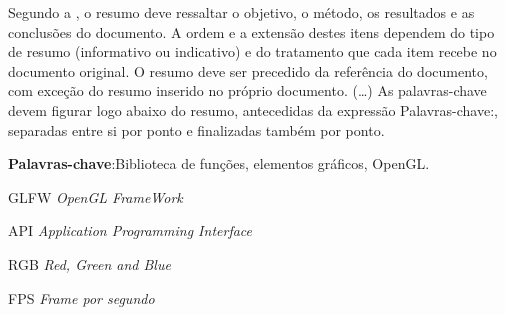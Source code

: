 \documentclass[12pt, %
openright,
oneside, %
a4paper,    %
brazil]{facom-ufu-abntex2}
\begin{document}





\begin{resumo} %
 Segundo a , o resumo deve ressaltar o
 objetivo, o método, os resultados e as conclusões do documento. A ordem e a extensão
 destes itens dependem do tipo de resumo (informativo ou indicativo) e do
 tratamento que cada item recebe no documento original. O resumo deve ser
 precedido da referência do documento, com exceção do resumo inserido no
 próprio documento. (\ldots) As palavras-chave devem figurar logo abaixo do
 resumo, antecedidas da expressão Palavras-chave:, separadas entre si por
 ponto e finalizadas também por ponto.

 \vspace{\onelineskip}

 \noindent
 \textbf{Palavras-chave}:Biblioteca de funções, elementos gráficos, OpenGL. %
\end{resumo}

\listoffigures*
\cleardoublepage

\iffalse
\pdfbookmark[0]{\listtablename}{lot}
\listoftables*
\cleardoublepage
\fi


\begin{siglas} %
  \item[GLFW] \textit{OpenGL FrameWork}
  \item[API] \textit{Application Programming Interface}
  \item[RGB] \textit{Red, Green and Blue}
  \item[FPS] \textit{Frame por segundo}
\end{siglas}
\end{document}
